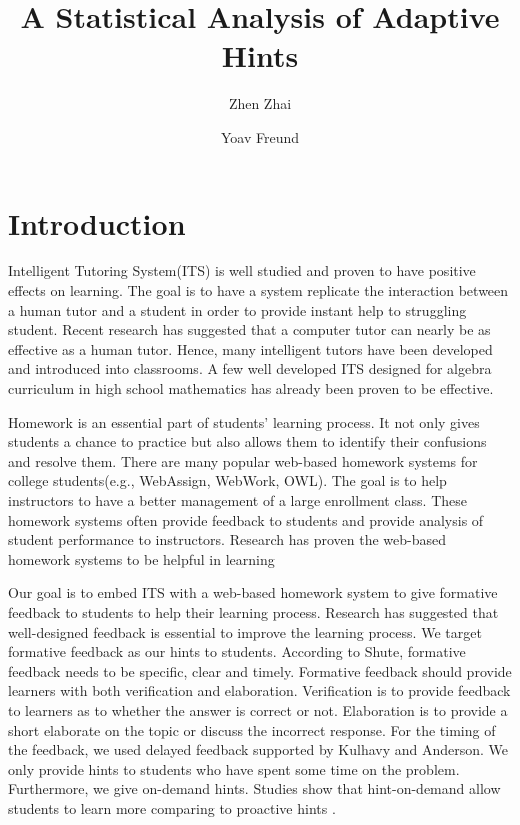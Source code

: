 \documentclass{llncs}
\title{A Statistical Analysis of Adaptive Hints}
\author{Zhen Zhai\inst{1} \and Yoav Freund\inst{2}}
\institute{UC San Diego \email{zzhai@eng.ucsd.edu} \and UC San Diego \email{yfreund@eng.ucsd.edu}}
\begin{document}
\maketitle


\begin{abstract}

\end{abstract}


\section{Introduction}
Intelligent Tutoring System(ITS) is well studied and proven to have positive effects on learning\cite{Anderson1995}. The goal is to have a system replicate the interaction between a human tutor and a student in order to provide instant help to struggling student. Recent research has suggested that a computer tutor can nearly be as effective as a human tutor\cite{Vanlehn2011}. Hence, many intelligent tutors have been developed and introduced into classrooms. A few well developed ITS designed for algebra curriculum in high school mathematics has already been proven to be effective\cite{Koedinger1997}\cite{John2014}.

Homework is an essential part of students' learning process\cite{Cooper2006}. It not only gives students a chance to practice but also allows them to identify their confusions and resolve them. There are many popular web-based homework systems for college students(e.g., WebAssign, WebWork, OWL). The goal is to help instructors to have a better management of a large enrollment class. These homework systems often provide feedback to students and provide analysis of student performance to instructors. Research has proven the web-based homework systems to be helpful in learning\cite{MestHartRath2002}\cite{Vanlehn2005}

Our goal is to embed ITS with a web-based homework system to give formative feedback to students to help their learning process. Research has suggested that well-designed feedback is essential to improve the learning process\cite{Azevedo1995}\cite{Bangert-Drowns1991}. We target formative feedback as our hints to students. According to Shute, formative feedback needs to be specific, clear and timely\cite{Shute2008}. Formative feedback should provide learners with both verification and elaboration\cite{Mason2001}\cite{Bangert-Drowns1991}. Verification is to provide feedback to learners as to whether the answer is correct or not. Elaboration is to provide a short elaborate on the topic or discuss the incorrect response. For the timing of the feedback, we used delayed feedback supported by Kulhavy and Anderson\cite{Kulhavy1972}. We only provide hints to students who have spent some time on the problem. Furthermore, we give on-demand hints. Studies show that hint-on-demand allow students to learn more comparing to proactive hints \cite{Razzaq2010}.
\end{document}
